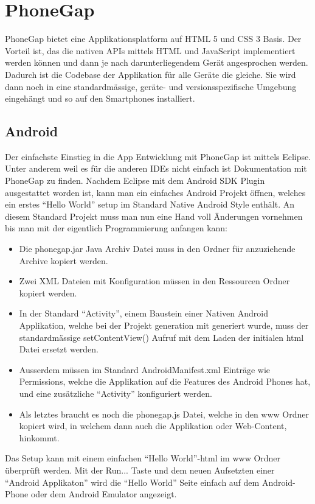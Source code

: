 
\newpage
\section{PhoneGap} %
\label{sec:PhoneGap}
PhoneGap bietet eine Applikationsplatform auf HTML 5 und CSS 3 Basis. Der Vorteil ist, das die nativen APIs mittels HTML und JavaScript implementiert werden können und dann je nach darunterliegendem Gerät angesprochen werden. Dadurch ist die Codebase der Applikation für alle Geräte die gleiche. Sie wird dann noch in eine standardmässige, geräte- und versionsspezifische Umgebung eingehängt und so auf den Smartphones installiert.

\subsection{Android} %
\label{sub:android}

Der einfachste Einstieg in die App Entwicklung mit PhoneGap ist mittels Eclipse. Unter anderem weil es für die anderen IDEs nicht einfach ist Dokumentation mit PhoneGap zu finden. Nachdem Eclipse mit dem Android SDK Plugin ausgestattet worden ist, kann man ein einfaches Android Projekt öffnen, welches ein erstes "`Hello World"' setup im Standard Native Android Style enthält. 
An diesem Standard Projekt muss man nun eine Hand voll Änderungen vornehmen bis man mit der eigentlich Programmierung anfangen kann:
\begin{itemize}
    \item Die phonegap.jar Java Archiv Datei muss in den Ordner für anzuziehende Archive kopiert werden.
    \item Zwei XML Dateien mit Konfiguration müssen in den Ressourcen Ordner kopiert werden. 
    \item In der Standard "`Activity"', einem Baustein einer Nativen Android Applikation, welche bei der Projekt generation mit generiert wurde, muss der standardmässige setContentView() Aufruf mit dem Laden der initialen html Datei ersetzt werden.
    \item Ausserdem müssen im Standard AndroidManifest.xml Einträge wie Permissions, welche die Applikation auf die Features des Android Phones hat, und eine zusätzliche "`Activity"' konfiguriert werden.
    \item Als letztes braucht es noch die phonegap.js Datei, welche in den www Ordner kopiert wird, in welchem dann auch die Applikation oder Web-Content, hinkommt.
\end{itemize}
Das Setup kann mit einem einfachen "`Hello World"'-html im www Ordner überprüft werden. Mit der Run... Taste und dem neuen Aufsetzten einer "`Android Applikaton"' wird die "`Hello World"' Seite einfach auf dem Android-Phone oder dem Android Emulator angezeigt.

